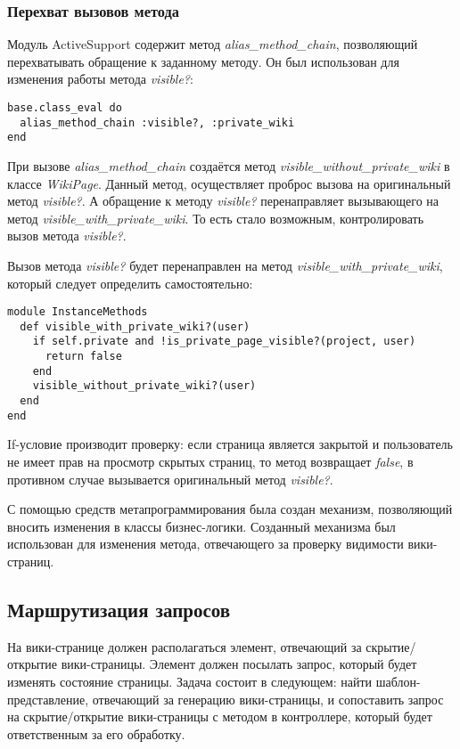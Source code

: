 \subsubsection{Перехват вызовов метода}
Модуль ActiveSupport содержит метод \textit{alias\_method\_chain}, позволяющий
перехватывать обращение к заданному методу. Он был использован для изменения
работы метода \textit{visible?}:
\small{\begin{lstlisting}
base.class_eval do
  alias_method_chain :visible?, :private_wiki
end
\end{lstlisting}}
При вызове \textit{alias\_method\_chain} создаётся метод
\textit{visible\_without\_private\_wiki} в классе \textit{WikiPage}. Данный
метод, осуществляет проброс вызова на оригинальный метод \textit{visible?}. А
обращение к методу \textit{visible?} перенаправляет вызывающего на метод
\textit{visible\_with\_private\_wiki}. То есть стало возможным, контролировать
вызов метода \textit{visible?}.

Вызов метода \textit{visible?} будет перенаправлен на метод
\textit{visible\_with\_private\_wiki}, который следует определить
самостоятельно:
\small{\begin{lstlisting}
module InstanceMethods
  def visible_with_private_wiki?(user)
    if self.private and !is_private_page_visible?(project, user)
      return false
    end
    visible_without_private_wiki?(user)
  end
end
\end{lstlisting}}
If-условие производит проверку: если страница является закрытой и пользователь
не имеет прав на просмотр скрытых страниц, то метод возвращает \textit{false},
в противном случае вызывается оригинальный метод \textit{visible?}. 

С помощью средств метапрограммирования была создан механизм, позволяющий
вносить изменения в классы бизнес-логики. Созданный механизма был использован
для изменения метода, отвечающего за проверку видимости вики-страниц.

\subsection{Маршрутизация запросов}
\label{section:routing}
На вики-странице должен располагаться элемент, отвечающий за скрытие/открытие
вики-страницы. Элемент должен посылать запрос, который будет изменять состояние
страницы. Задача состоит в следующем: найти шаблон-представление, отвечающий за
генерацию вики-страницы, и сопоставить запрос на скрытие/открытие вики-страницы
с методом в контроллере, который будет ответственным за его обработку.

